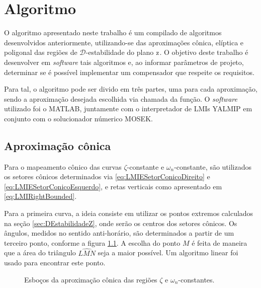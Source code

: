 \chapter{Algoritmo}

O algoritmo apresentado neste trabalho é um compilado de algoritmos desenvolvidos anteriormente, utilizando-se das aproximações cônica, elíptica e poligonal das regiões de $\mathscr{D}$-estabilidade do plano $\operatorname{\mathrm{z}}$. O objetivo deste trabalho é desenvolver em \emph{software} tais algoritmos e, ao informar parâmetros de projeto, determinar se é possível implementar um compensador que respeite os requisitos.

Para tal, o algoritmo pode ser divido em três partes, uma para cada aproximação, sendo a aproximação desejada escolhida via chamada da função. O \emph{software} utilizado foi o MATLAB, juntamente com o interpretador de LMIs YALMIP em conjunto com o solucionador númerico MOSEK. 

\section{Aproximação cônica}
Para o mapeamento cônico das curvas $\zeta$-constante e $\omega_n$-constante, são utilizados os setores cônicos determinados via \eqref{eq:LMIESetorConicoDireito} e \eqref{eq:LMIESetorConicoEsquerdo}, e retas verticais como apresentado em \ref{eq:LMIRightBounded}.

Para a primeira curva, a ideia consiste em utilizar os pontos extremos calculados na seção \ref{sec:DEstabilidadeZ}, onde serão os centros dos setores cônicos. Os ângulos, medidos no sentido anti-horário, são determinados a partir de um terceiro ponto, conforme a figura \ref{subfig:AproximacaoConicaZeta}. A escolha do ponto $M$ é feita de maneira que a área do triângulo $\widehat{LMN}$ seja a maior possível. Um algoritmo linear foi usado para encontrar este ponto.

\begin{figure}[!hb]
  \centering
  \begin{subfigure}[t]{0.4\columnwidth}
      
      \caption{}
      \label{subfig:AproximacaoConicaZeta}
  \end{subfigure}
  \begin{subfigure}[t]{0.4\columnwidth}
      
      \caption{}
      \label{subfig:AproximacaoConicaWn}
  \end{subfigure}
  \caption{Esboços da aproximação cônica das regiões $\zeta$ e $\omega_n$-constantes.}
  \label{fig:AproximacoesConica}
\end{figure}

